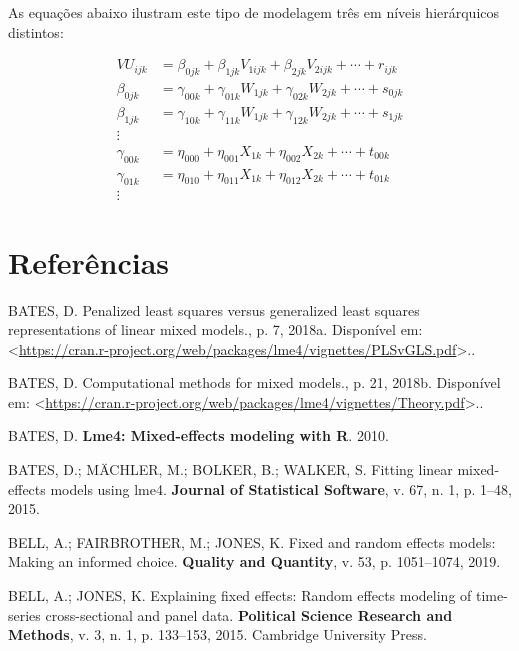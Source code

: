 \documentclass[
  a4paper, 11pt]{article}
\begin{document}
As equações abaixo ilustram este tipo de modelagem três em níveis
hierárquicos distintos:

\begin{align*}
VU_{ijk}  &= \beta_{0jk} + \beta_{1jk} V_{1ijk} + \beta_{2jk} V_{2ijk} + \cdots + r_{ijk}\\ 
\beta_{0jk} &= \gamma_{00k} + \gamma_{01k}W_{1jk} + \gamma_{02k}W_{2jk} + \cdots+ s_{0jk}\\ 
\beta_{1jk} &= \gamma_{10k} + \gamma_{11k}W_{1jk} + \gamma_{12k}W_{2jk} + \cdots+ s_{1jk}\\ 
\vdots \\
\gamma_{00k} &= \eta_{000} + \eta_{001} X_{1k} + \eta_{002} X_{2k} + \cdots +  t_{00k}\\ 
\gamma_{01k} &= \eta_{010} + \eta_{011} X_{1k} + \eta_{012} X_{2k} + \cdots +  t_{01k}\\ 
\vdots
\end{align*}

\hypertarget{referuxeancias}{%
\section*{Referências}\label{referuxeancias}}

\hypertarget{refs}{}
\leavevmode\hypertarget{ref-Bates3}{}%
BATES, D. Penalized least squares versus generalized least squares
representations of linear mixed models., p. 7, 2018a. Disponível em:
\textless{}\url{https://cran.r-project.org/web/packages/lme4/vignettes/PLSvGLS.pdf}\textgreater..

\leavevmode\hypertarget{ref-Bates2}{}%
BATES, D. Computational methods for mixed models., p. 21, 2018b.
Disponível em:
\textless{}\url{https://cran.r-project.org/web/packages/lme4/vignettes/Theory.pdf}\textgreater..

\leavevmode\hypertarget{ref-Batesbook}{}%
BATES, D. \textbf{Lme4: Mixed-effects modeling with R}. 2010.

\leavevmode\hypertarget{ref-Bates}{}%
BATES, D.; MÄCHLER, M.; BOLKER, B.; WALKER, S. Fitting linear
mixed-effects models using lme4. \textbf{Journal of Statistical
Software}, v. 67, n. 1, p. 1--48, 2015.

\leavevmode\hypertarget{ref-bell2019}{}%
BELL, A.; FAIRBROTHER, M.; JONES, K. Fixed and random effects models:
Making an informed choice. \textbf{Quality and Quantity}, v. 53, p.
1051--1074, 2019.

\leavevmode\hypertarget{ref-bell2015}{}%
BELL, A.; JONES, K. Explaining fixed effects: Random effects modeling of
time-series cross-sectional and panel data. \textbf{Political Science
Research and Methods}, v. 3, n. 1, p. 133--153, 2015. Cambridge
University Press.
\end{document}
